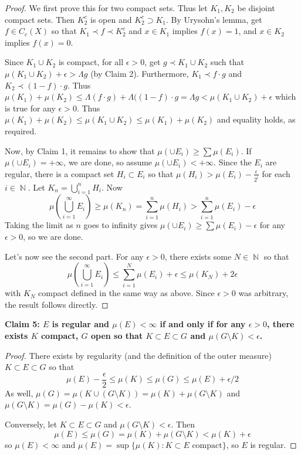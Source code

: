 \documentclass[12pt, a4paper]{book}
\DeclareMathOperator{\N}{\mathbb{N}}
\theoremstyle{nonumberplain}
\newtheorem{proof}{Proof}
\begin{document}
\begin{proof}
    We first prove this for two compact sets.
    Thus let $K_1,K_2$ be disjoint compact sets.
    Then $K_2^c$ is open and $K_2^c\supset K_1$.
    By Urysohn's lemma, get $f\in C_c(X)$ so that $K_1\prec f\prec K_2^c$ and $x\in K_1$ implies $f(x)=1$, and $x\in K_2$ implies $f(x)=0$.

    Since $K_1\cup K_2$ is compact, for all $\epsilon>0$, get $g\prec K_1\cup K_2$ such that $\mu(K_1\cup K_2)+\epsilon>\Lambda g$ (by Claim 2).
    Furthermore, $K_1\prec f\cdot g$ and $K_2\prec(1-f)\cdot g$.
    Thus $\mu(K_1)+\mu(K_2)\leq\Lambda(f\cdot g)+\Lambda((1-f)\cdot g=\Lambda g<\mu(K_1\cup K_2)+\epsilon$ which is true for any $\epsilon>0$.
    Thus $\mu(K_1)+\mu(K_2)\leq\mu(K_1\cup K_2)\leq\mu(K_1)+\mu(K_2)$ and equality holds, as required.

    Now, by Claim 1, it remains to show that $\mu(\cup E_i)\geq\sum\mu(E_i)$.
    If $\mu(\cup E_i)=+\infty$, we are done, so assume $\mu(\cup E_i)<+\infty$.
    Since the $E_i$ are regular, there is a compact set $H_i\subset E_i$ so that $\mu(H_i)>\mu(E_i)-\frac{\epsilon}{2^i}$ for each $i\in\N$.
    Let $K_n=\bigcup_{i=1}^n H_i$.
    Now
    \begin{equation*}
        \mu\left(\bigcup\limits_{i=1}^\infty E_i\right) \geq \mu(K_n)= \sum\limits_{i=1}^n \mu(H_i)> \sum\limits_{i=1}^n\mu(E_i)-\epsilon
    \end{equation*}
    Taking the limit as $n$ goes to infinity gives $\mu(\cup E_i)\geq \sum\mu(E_i)-\epsilon$ for any $\epsilon>0$, so we are done.

    Let's now see the second part.
    For any $\epsilon>0$, there exists some $N\in\N$ so that
    \begin{equation*}
        \mu\left(\bigcup\limits_{i=1}^\infty E_i\right) \leq \sum\limits_{i=1}^N\mu(E_i)+\epsilon\leq \mu(K_N)+2\epsilon
    \end{equation*}
    with $K_N$ compact defined in the same way as above.
    Since $\epsilon>0$ was arbitrary, the result follows directly.
\end{proof}
\textbf{Claim 5: $E$ is regular and $\mu(E)<\infty$ if and only if for any $\epsilon>0$, there exists $K$ compact, $G$ open so that $K\subset E\subset G$ and $\mu(G\setminus K)<\epsilon$.}
\begin{proof}
    There exists by regularity (and the definition of the outer measure) $K\subset E\subset G$ so that
    \[\mu(E)-\frac{\epsilon}{2}\leq \mu(K)\leq \mu(G)\leq \mu(E)+\epsilon/2\]
    As well, $\mu(G)=\mu(K\cup(G\setminus K))=\mu(K)+\mu(G\setminus K)$ and $\mu(G\setminus K)=\mu(G)-\mu(K)<\epsilon$.

    Conversely, let $K\subset E\subset G$ and $\mu(G\setminus K)<\epsilon$.
    Then
    \[\mu(E)\leq\mu(G)=\mu(K)+\mu(G\setminus K)<\mu(K)+\epsilon\]
    so $\mu(E)<\infty$ and $\mu(E)=\sup\{\mu(K):K\subset E\text{ compact}\}$, so $E$ is regular.
\end{proof}
\end{document}
